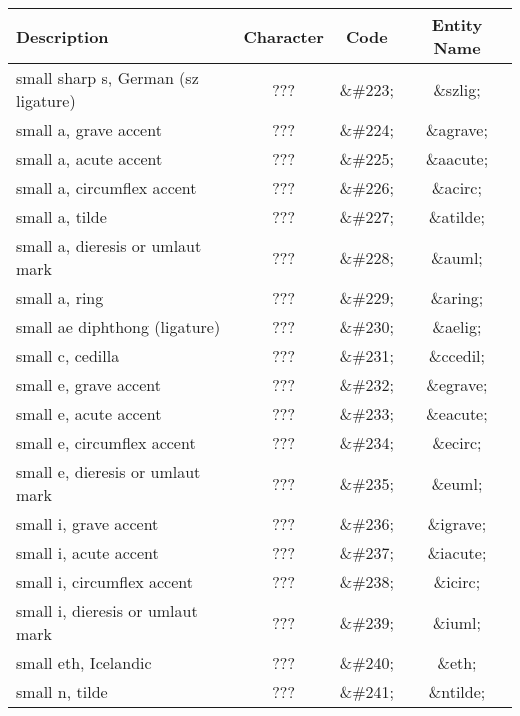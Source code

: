 \begin{table}[htbp]
  \begin{center}
    \leavevmode


    \begin{tabular}{lc>{\ttfamily}c>{\ttfamily}c}
      \textbf{Description} &
      \textbf{Character} &
      \textbf{Code} &
      \textbf{Entity Name} \\
      \hline
      small sharp s, German (sz ligature) & ??? & \&\#223; & \&szlig; \\
      small a, grave accent               & ??? & \&\#224; & \&agrave; \\
      small a, acute accent               & ??? & \&\#225; & \&aacute; \\
      small a, circumflex accent          & ??? & \&\#226; & \&acirc; \\
      \hline
      small a, tilde                      & ??? & \&\#227; & \&atilde; \\
      small a, dieresis or umlaut mark    & ??? & \&\#228; & \&auml; \\
      small a, ring                       & ??? & \&\#229; & \&aring; \\
      small ae diphthong (ligature)       & ??? & \&\#230; & \&aelig; \\
      \hline
      small c, cedilla                    & ??? & \&\#231; & \&ccedil; \\
      small e, grave accent               & ??? & \&\#232; & \&egrave; \\
      small e, acute accent               & ??? & \&\#233; & \&eacute; \\
      small e, circumflex accent          & ??? & \&\#234; & \&ecirc; \\
      \hline
      small e, dieresis or umlaut mark    & ??? & \&\#235; & \&euml; \\
      small i, grave accent               & ??? & \&\#236; & \&igrave; \\
      small i, acute accent               & ??? & \&\#237; & \&iacute; \\
      small i, circumflex accent          & ??? & \&\#238; & \&icirc; \\
      \hline
      small i, dieresis or umlaut mark    & ??? & \&\#239; & \&iuml; \\
      small eth, Icelandic                & ??? & \&\#240; & \&eth; \\
      small n, tilde                      & ??? & \&\#241; & \&ntilde; \\

\end{tabular}
\end{center}
\end{table}
